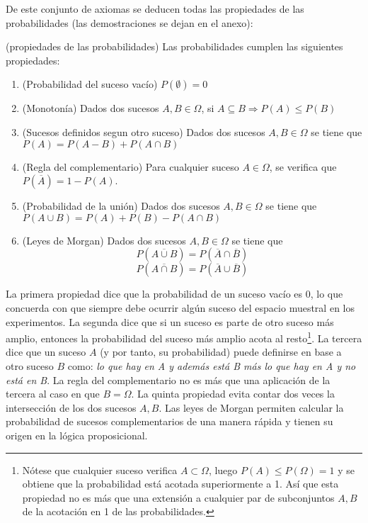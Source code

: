 De este conjunto de axiomas se deducen todas las propiedades de las probabilidades (las demostraciones se dejan en el anexo):
\begin{definition}(propiedades de las probabilidades)
Las probabilidades cumplen las siguientes propiedades:
\begin{enumerate}
	\item (Probabilidad del suceso vacío) $P(\emptyset) = 0$
	\item (Monotonía) Dados dos sucesos $A, B \in \Omega$, si $A \subseteq B \Rightarrow P(A) \le P(B)$
	\item (Sucesos definidos segun otro suceso) Dados dos sucesos $A, B \in \Omega$ se tiene que $P(A) = P(A-B)+ P(A \cap B)$
	\item (Regla del complementario) Para cualquier suceso $A \in \Omega$, se verifica que $P(\overline{A}) = 1 - P(A)$.
	\item (Probabilidad de la unión) Dados dos sucesos $A, B \in \Omega$ se tiene que $P(A \cup B) = P(A)+P(B)-P(A \cap B)$
	\item (Leyes de Morgan) Dados dos sucesos $A, B \in \Omega$ se tiene que 
	$$P(\overline{A \cup B}) = P(\overline{A}\cap \overline{B})$$
	$$P(\overline{A \cap B}) = P(\overline{A}\cup \overline{B})$$
\end{enumerate}
\end{definition}
La primera propiedad dice que la probabilidad de un suceso vacío es 0, lo que concuerda con que siempre debe ocurrir algún suceso del espacio muestral en los experimentos. La segunda dice que si un suceso es parte de otro suceso más amplio, entonces la probabilidad del suceso más amplio acota al resto\footnote{Nótese que cualquier suceso verifica $A \subset \Omega$, luego $P(A) \le P(\Omega) = 1$ y se obtiene que la probabilidad está acotada superiormente a 1. Así que esta propiedad no es más que una extensión a cualquier par de subconjuntos $A, B$ de la acotación en 1 de las probabilidades.}. La tercera dice que un suceso $A$ (y por tanto, su probabilidad) puede definirse en base a otro suceso $B$ como: \textit{lo que hay en A y además está B más lo que hay en A y no está en B}. La regla del complementario no es más que una aplicación de la tercera al caso en que $B = \Omega$. La quinta propiedad evita contar dos veces la intersección de los dos sucesos $A, B$. Las leyes de Morgan permiten calcular la probabilidad de sucesos complementarios de una manera rápida y tienen su origen en la lógica proposicional.

